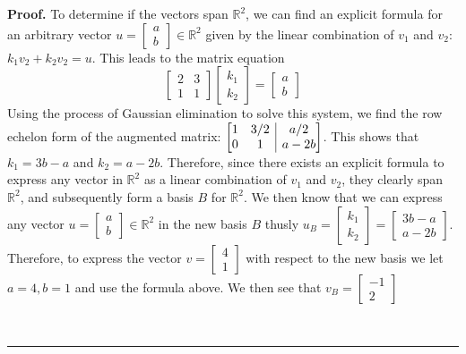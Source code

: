 \documentclass[12pt]{article}
\makeatletter
\numberwithin{equation}{section}
\newenvironment{proof}[1][Proof]{\textbf{#1.} }{\ \rule{0.5em}{0.5em}}
\newenvironment{amatrix}[1]{%
  \left[\begin{array}{@{}*{#1}{c}|c@{}}
}{%
  \end{array}\right]
}
\makeatother
\begin{document}
\begin{enumerate}
\begin{enumerate}
\begin{proof}
            To determine if the vectors span $\mathbb{R}^2$, we can find an explicit formula for an arbitrary vector $u=\left[\begin{array}{c}a\\b\end{array}\right]\in\mathbb{R}^2$ given by the linear combination of $v_1$ and $v_2$: $k_1v_2+k_2v_2=u$. This leads to the matrix equation
            $$\left[\begin{array}{cc}2&3\\1&1\end{array}\right]\left[\begin{array}{c}k_1\\k_2\end{array}\right]=\left[\begin{array}{c}a\\b\end{array}\right]$$
            Using the process of Gaussian elimination to solve this system, we find the row echelon form of the augmented matrix: $\begin{amatrix}{2}1&3/2&a/2\\0&1&a-2b\end{amatrix}$. This shows that\\ $k_1=3b-a$ and $k_2=a-2b$. Therefore, since there exists an explicit formula to express any vector in $\mathbb{R}^2$ as a linear combination of $v_1$ and $v_2$, they clearly span $\mathbb{R}^2$, and subsequently form a basis $B$ for $\mathbb{R}^2$. We then know that we can express any vector $u=\left[\begin{array}{c}a\\b\end{array}\right]\in\mathbb{R}^2$ in the new basis $B$ thusly $u_B=\left[\begin{array}{c}k_1\\k_2\end{array}\right]=\left[\begin{array}{c}3b-a\\a-2b\end{array}\right]$.
            Therefore, to express the vector $v=\left[\begin{array}{c}4\\1\end{array}\right]$ with respect to the new basis we let $a=4,b=1$ and use the formula above. We then see that $v_B=\left[\begin{array}{c}-1\\2\end{array}\right]$

\end{proof}
\end{enumerate}
\end{enumerate}
\end{document}
